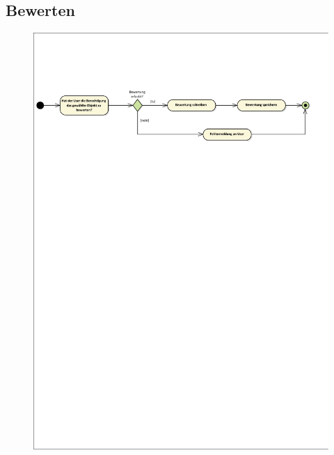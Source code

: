 \vfill

\subsection*{Bewerten}
\begin{figure}[h!]
	\centering
	\includegraphics[width=0.8\linewidth]{docs/3_Aktivitaetsdiagramme/Richard/bewerten.pdf}
	\label{fig:ActDia_Bewerten}
\end{figure}

\vfill

